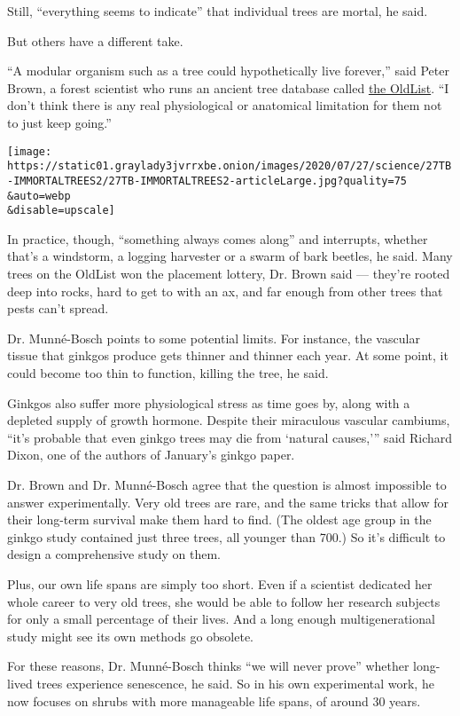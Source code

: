 Still, ``everything seems to indicate'' that individual trees are
mortal, he said.

But others have a different take.

``A modular organism such as a tree could hypothetically live forever,''
said Peter Brown, a forest scientist who runs an ancient tree database
called \href{http://www.rmtrr.org/oldlist.htm}{the OldList}. ``I don't
think there is any real physiological or anatomical limitation for them
not to just keep going.''

\texttt{[image: https://static01.graylady3jvrrxbe.onion/images/2020/07/27/science/27TB-IMMORTALTREES2/27TB-IMMORTALTREES2-articleLarge.jpg?quality=75\\\&auto=webp\\\&disable=upscale]}

In practice, though, ``something always comes along'' and interrupts,
whether that's a windstorm, a logging harvester or a swarm of bark
beetles, he said. Many trees on the OldList won the placement lottery,
Dr. Brown said --- they're rooted deep into rocks, hard to get to with
an ax, and far enough from other trees that pests can't spread.

Dr. Munné-Bosch points to some potential limits. For instance, the
vascular tissue that ginkgos produce gets thinner and thinner each year.
At some point, it could become too thin to function, killing the tree,
he said.

Ginkgos also suffer more physiological stress as time goes by, along
with a depleted supply of growth hormone. Despite their miraculous
vascular cambiums, ``it's probable that even ginkgo trees may die from
`natural causes,''' said Richard Dixon, one of the authors of January's
ginkgo paper.

Dr. Brown and Dr. Munné-Bosch agree that the question is almost
impossible to answer experimentally. Very old trees are rare, and the
same tricks that allow for their long-term survival make them hard to
find. (The oldest age group in the ginkgo study contained just three
trees, all younger than 700.) So it's difficult to design a
comprehensive study on them.

Plus, our own life spans are simply too short. Even if a scientist
dedicated her whole career to very old trees, she would be able to
follow her research subjects for only a small percentage of their lives.
And a long enough multigenerational study might see its own methods go
obsolete.

For these reasons, Dr. Munné-Bosch thinks ``we will never prove''
whether long-lived trees experience senescence, he said. So in his own
experimental work, he now focuses on shrubs with more manageable life
spans, of around 30 years.

